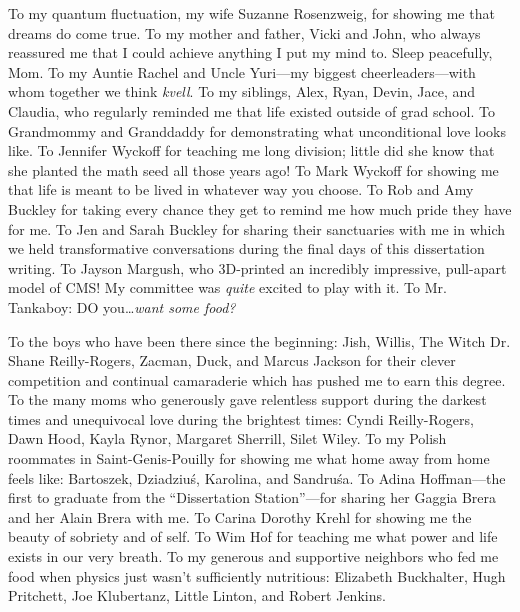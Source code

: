 To my quantum fluctuation, my wife Suzanne Rosenzweig, for showing me that dreams do come true.
To my mother and father, Vicki and John, who always reassured me that I could achieve anything I put my mind to. Sleep peacefully, Mom.
To my Auntie Rachel and Uncle Yuri---my biggest cheerleaders---with whom together we think \emph{kvell}.
To my siblings, Alex, Ryan, Devin, Jace, and Claudia, who regularly reminded me that life existed outside of grad school.
To Grandmommy and Granddaddy for demonstrating what unconditional love looks like.
To Jennifer Wyckoff for teaching me long division; little did she know that she planted the math seed all those years ago!
To Mark Wyckoff for showing me that life is meant to be lived in whatever way you choose.
To Rob and Amy Buckley for taking every chance they get to remind me how much pride they have for me.
To Jen and Sarah Buckley for sharing their sanctuaries with me in which we held transformative conversations during the final days of this dissertation writing.
To Jayson Margush, who 3D-printed an incredibly impressive, pull-apart model of CMS! My committee was \emph{quite} excited to play with it.
To Mr. Tankaboy: DO you\ldots \emph{want some food?}

To the boys who have been there since the beginning: Jish, Willis, The Witch Dr. Shane Reilly-Rogers, Zacman, Duck, and Marcus Jackson for their clever competition and continual camaraderie which has pushed me to earn this degree.
To the many moms who generously gave relentless support during the darkest times and unequivocal love during the brightest times:
Cyndi Reilly-Rogers, Dawn Hood, Kayla Rynor, Margaret Sherrill, Silet Wiley.
To my Polish roommates in Saint-Genis-Pouilly for showing me what home away from home feels like: Bartoszek, Dziadziuś, Karolina, and Sandruśa.
To Adina Hoffman---the first to graduate from the ``Dissertation Station''---for sharing her Gaggia Brera and her Alain Brera with me.
To Carina Dorothy Krehl for showing me the beauty of sobriety and of self.
To Wim Hof for teaching me what power and life exists in our very breath.
To my generous and supportive neighbors who fed me food when physics just wasn't sufficiently nutritious: Elizabeth Buckhalter, Hugh Pritchett, Joe Klubertanz, Little Linton, and Robert Jenkins.

